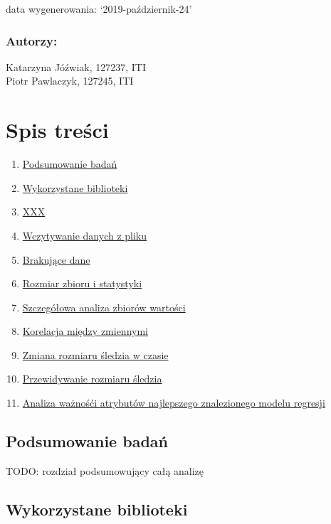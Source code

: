 \documentclass[]{article}
\title{}
\author{}
\date{}
\providecommand{\tightlist}{%
  \setlength{\itemsep}{0pt}\setlength{\parskip}{0pt}}
\begin{document}
data wygenerowania: `2019-październik-24'

\hypertarget{autorzy}{%
\subsubsection{Autorzy:}\label{autorzy}}

Katarzyna Jóźwiak, 127237, ITI\\
Piotr Pawlaczyk, 127245, ITI

\hypertarget{spis-treux15bci}{%
\section{Spis treści}\label{spis-treux15bci}}

\begin{enumerate}
\def\labelenumi{\arabic{enumi}.}
\tightlist
\item
  \protect\hyperlink{summary}{Podsumowanie badań}
\item
  \protect\hyperlink{librarys}{Wykorzystane biblioteki}
\item
  \protect\hyperlink{xxx}{XXX}
\item
  \protect\hyperlink{readDataFromFile}{Wczytywanie danych z pliku}
\item
  \protect\hyperlink{missingData}{Brakujące dane}
\item
  \protect\hyperlink{statistics}{Rozmiar zbioru i statystyki}
\item
  \protect\hyperlink{analisis}{Szczegółowa analiza zbiorów wartości}
\item
  \protect\hyperlink{correlation}{Korelacja między zmiennymi}
\item
  \protect\hyperlink{animation}{Zmiana rozmiaru śledzia w czasie}
\item
  \protect\hyperlink{prediction}{Przewidywanie rozmiaru śledzia}
\item
  \protect\hyperlink{bestModelAnalisis}{Analiza ważnośći atrybutów
  najlepszego znalezionego modelu regresji}
\end{enumerate}

\hypertarget{podsumowanie-badaux144}{%
\subsection{Podsumowanie badań }\label{podsumowanie-badaux144}}

TODO: rozdział podsumowujący całą analizę

\hypertarget{wykorzystane-biblioteki}{%
\subsection{Wykorzystane biblioteki }\label{wykorzystane-biblioteki}}
\end{document}
